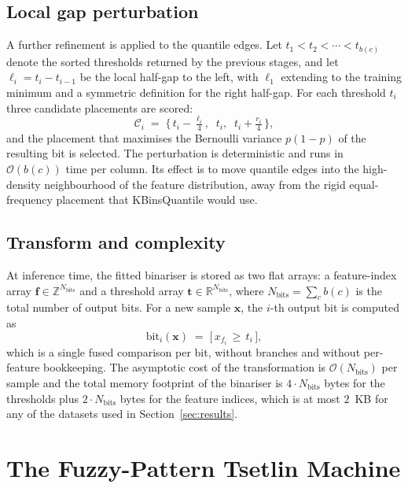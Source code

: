 \documentclass[journal,10pt]{IEEEtran}
\begin{document}
\subsection{Local gap perturbation}
\label{sec:glade-perturb}
A further refinement is applied to the quantile edges. Let
$t_1 < t_2 < \cdots < t_{b(c)}$ denote the sorted thresholds
returned by the previous stages, and let $\ell_i = t_i - t_{i-1}$
be the local half-gap to the left, with $\ell_1$ extending to the
training minimum and a symmetric definition for the right half-gap.
For each threshold $t_i$ three candidate placements are scored:
\begin{equation}
  \mathcal{C}_i \;=\; \bigl\{\,
     t_i - \tfrac{\ell_i}{4},\;\;
     t_i,\;\;
     t_i + \tfrac{r_i}{4}\,
  \bigr\},
  \label{eq:perturb}
\end{equation}
and the placement that maximises the Bernoulli variance
$p(1-p)$ of the resulting bit is selected. The perturbation is
deterministic and runs in $\mathcal{O}(b(c))$ time per column. Its
effect is to move quantile edges into the high-density neighbourhood
of the feature distribution, away from the rigid equal-frequency
placement that KBinsQuantile would use.

\subsection{Transform and complexity}
\label{sec:glade-transform}
At inference time, the fitted binariser is stored as two flat arrays:
a feature-index array $\mathbf{f} \in \mathbb{Z}^{N_\text{bits}}$ and
a threshold array $\mathbf{t} \in \mathbb{R}^{N_\text{bits}}$, where
$N_\text{bits} = \sum_c b(c)$ is the total number of output bits.
For a new sample $\mathbf{x}$, the $i$-th output bit is computed as
\begin{equation}
  \mathrm{bit}_i(\mathbf{x}) \;=\;
      \bigl[\, x_{f_i} \,\ge\, t_i \,\bigr],
  \label{eq:transform}
\end{equation}
which is a single fused comparison per bit, without branches and
without per-feature bookkeeping. The asymptotic cost of the
transformation is $\mathcal{O}(N_\text{bits})$ per sample and the
total memory footprint of the binariser is
$4 \cdot N_\text{bits}$ bytes for the thresholds plus
$2 \cdot N_\text{bits}$ bytes for the feature indices, which is at
most $2$~KB for any of the datasets used in Section~\ref{sec:results}.

\section{The Fuzzy-Pattern Tsetlin Machine}
\label{sec:fptm}
\end{document}

